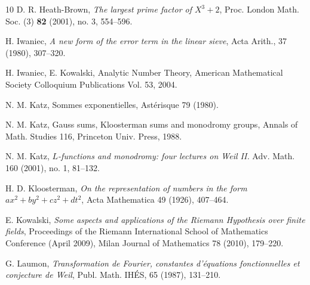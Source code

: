 \documentclass[12pt,a4paper,reqno]{amsart}
\numberwithin{equation}{section}
\theoremstyle{plain}
\theoremstyle{definition}
\begin{document}
\begin{thebibliography}{10}
D. R. 	Heath-Brown, \emph{The largest prime factor of $X^3+2$}, Proc. London Math. Soc. (3) \textbf{82} (2001), no. 3, 554--596.





 H. Iwaniec, \emph{A new form of the error term in
     the linear sieve}, Acta Arith., 37 (1980), 307--320.

 H. Iwaniec, E. Kowalski, Analytic Number Theory,
   American Mathematical Society Colloquium Publications Vol. 53,
   2004.

 N. M. Katz, Sommes exponentielles, Ast\'erisque
   79 (1980).

  N. M. Katz, Gauss sums, Kloosterman sums and
     monodromy groups, Annals of Math. Studies 116, Princeton
   Univ. Press, 1988.

  
  N. M. Katz, \textit{$L$-functions and monodromy:
     four lectures on Weil II.}  Adv. Math.  160 (2001), no. 1,
   81--132.
 
  H. D. Kloosterman, \emph{On the representation
     of numbers in the form $ax^2 + by^2 + cz^2 + dt^2$}, Acta
   Mathematica 49 (1926), 407--464.

 E. Kowalski, \textit{Some aspects and applications
    of the Riemann Hypothesis over finite fields}, Proceedings of the
  Riemann International School of Mathematics Conference (April 2009),
  Milan Journal of Mathematics 78 (2010), 179--220.

 G. Laumon, \textit{Transformation de Fourier,
    constantes d'\'equations fonctionnelles et conjecture de Weil},
  Publ. Math. IH\'ES, 65 (1987), 131--210.


\end{thebibliography}
\end{document}
